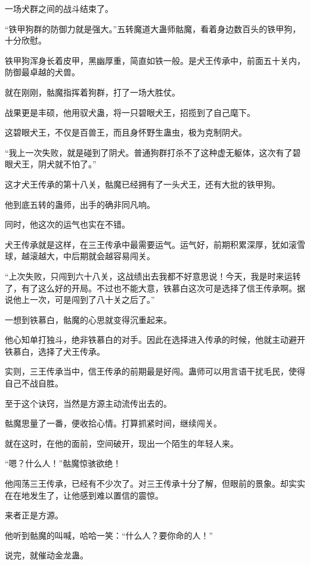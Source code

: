 
\begin{this_body}

一场犬群之间的战斗结束了。

“铁甲狗群的防御力就是强大。”五转魔道大蛊师骷魔，看着身边数百头的铁甲狗，十分欣慰。

铁甲狗浑身长着皮甲，黑幽厚重，简直如铁一般。是犬王传承中，前面五十关内，防御最卓越的犬兽。

就在刚刚，骷魔指挥着狗群，打了一场大胜仗。

战果更是丰硕，他用驭犬蛊，将一只碧眼犬王，招揽到了自己麾下。

这碧眼犬王，不仅是百兽王，而且身怀野生蛊虫，极为克制阴犬。

“我上一次失败，就是碰到了阴犬。普通狗群打杀不了这种虚无躯体，这次有了碧眼犬王，阴犬就不怕了。”

这才犬王传承的第十八关，骷魔已经拥有了一头犬王，还有大批的铁甲狗。

他到底五转的蛊师，出手的确非同凡响。

同时，他这次的运气也实在不错。

犬王传承就是这样，在三王传承中最需要运气。运气好，前期积累深厚，犹如滚雪球，越滚越大，中后期就会越容易闯关。

“上次失败，只闯到六十八关，这战绩出去我都不好意思说！今天，我是时来运转了，有了这么好的开局。不过也不能大意，铁慕白这次可是选择了信王传承啊。据说他上一次，可是闯到了八十关之后了。”

一想到铁慕白，骷魔的心思就变得沉重起来。

他心知单打独斗，绝非铁慕白的对手。因此在选择进入传承的时候，他就主动避开铁慕白，选择了犬王传承。

实则，三王传承当中，信王传承的前期最是好闯。蛊师可以用言语干扰毛民，使得自己不战自胜。

至于这个诀窍，当然是方源主动流传出去的。

骷魔思量了一番，便收拾心情。打算抓紧时间，继续闯关。

就在这时，在他的面前，空间破开，现出一个陌生的年轻人来。

“嗯？什么人！”骷魔惊骇欲绝！

他闯荡三王传承，已经有不少次了。对三王传承十分了解，但眼前的景象。却实实在在地发生了，让他感到难以置信的震惊。

来者正是方源。

他听到骷魔的叫喊，哈哈一笑：“什么人？要你命的人！”

说完，就催动金龙蛊。


\end{this_body}
